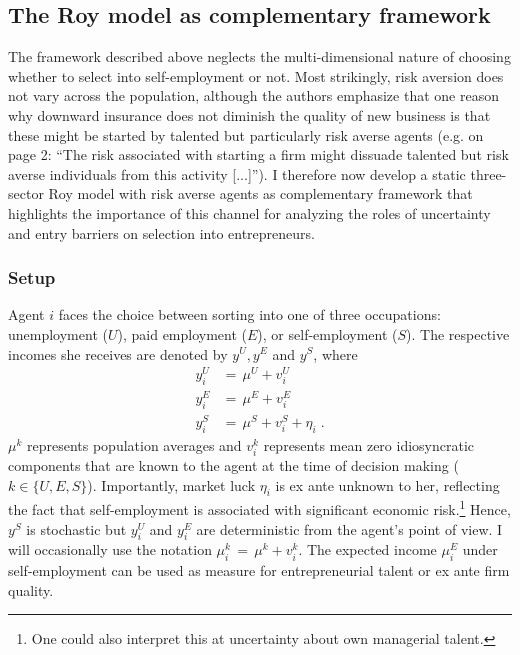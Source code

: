 \subsection{The Roy model as complementary framework}

The framework described above neglects the multi-dimensional nature of choosing whether to select into self-employment or not. Most strikingly, risk aversion does not vary across the population, although the authors emphasize that one reason why downward insurance does not diminish the quality of new business is that these might be started by talented but particularly risk averse agents (e.g. on page 2: ``The risk associated with starting a firm might dissuade
talented but risk averse individuals from this activity [...]''). I therefore now develop a static three-sector Roy model with risk averse agents as complementary framework that highlights the importance of this channel for analyzing the roles of uncertainty and entry barriers on selection into entrepreneurs.

\subsubsection*{Setup}

Agent $i$ faces the choice between sorting into one of three occupations: unemployment ($U$), paid employment ($E$), or self-employment ($S$). The respective incomes she receives are denoted by $y^U, y^E$ and $y^S$, where \vspace{-0.75em}
\begin{align}
y^U_i & = \, \mu^U + v_i^U \\[3pt]
y^E_i & = \, \mu^E + v_i^E \\[3pt]
y^S_i & = \, \mu^S + v_i^S + \eta_i \; .
\end{align} \vspace{-0.25em}
 $\mu^k$ represents population averages and $v_i^k$ represents mean zero idiosyncratic components  that are known to the agent at the time of decision making ($k \in \{U, E, S\}$). Importantly, market luck $\eta_i$ is ex ante unknown to her, reflecting the fact that self-employment is associated with significant economic risk.\footnote{One could also interpret this at uncertainty about own managerial talent.} Hence, $y^S$ is stochastic but $y^U_i$ and $y^E_i$ are deterministic from the agent's point of view. I will occasionally use the notation $\mu_i^k \, = \, \mu^k + v_i^k$. The expected income $\mu_i^E$ under self-employment can be used as measure for entrepreneurial talent or ex ante firm quality.


